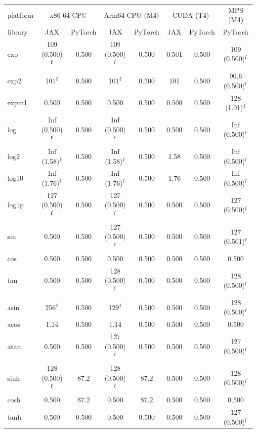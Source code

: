 \begin{table}
\centering
\begin{small}
\begin{tabular}{|l|cc|cc|cc|c|}
\hline
platform & \multicolumn{2}{c|}{x86-64 CPU} & \multicolumn{2}{c|}{Arm64 CPU (M4)} & \multicolumn{2}{c|}{CUDA (T4)} & \multicolumn{1}{c|}{MPS (M4)} \\
library & JAX & PyTorch & JAX & PyTorch & JAX & PyTorch & PyTorch \\ \hline
exp & 109 (0.500)$^{\rm f}$ & 0.500 & 109 (0.500)$^{\rm f}$ & 0.500 & 0.501 & 0.500 & 109 (0.500)$^{\rm f}$ \\
exp2 & 101$^{\rm f}$ & 0.500 & 101$^{\rm f}$ & 0.500 & 101 & 0.500 & 90.6 (0.500)$^{\rm f}$ \\
expm1 & 0.500 & 0.500 & 0.500 & 0.500 & 0.500 & 0.500 & 128 (1.01)$^{\rm f}$ \\
log & Inf (0.500)$^{\rm f}$ & 0.500 & Inf (0.500)$^{\rm f}$ & 0.500 & 0.500 & 0.500 & Inf (0.500)$^{\rm f}$ \\
log2 & Inf (1.58)$^{\rm f}$ & 0.500 & Inf (1.58)$^{\rm f}$ & 0.500 & 1.58 & 0.500 & Inf (0.500)$^{\rm f}$ \\
log10 & Inf (1.76)$^{\rm f}$ & 0.500 & Inf (1.76)$^{\rm f}$ & 0.500 & 1.76 & 0.500 & Inf (0.500)$^{\rm f}$ \\
log1p & 127 (0.500)$^{\rm f}$ & 0.500 & 127 (0.500)$^{\rm f}$ & 0.500 & 0.500 & 0.500 & 127 (0.500)$^{\rm f}$ \\
sin & 0.500 & 0.500 & 127 (0.500)$^{\rm f}$ & 0.500 & 0.500 & 0.500 & 127 (0.501)$^{\rm f}$ \\
cos & 0.500 & 0.500 & 0.500 & 0.500 & 0.500 & 0.500 & 0.500 \\
tan & 0.500 & 0.500 & 128 (0.500)$^{\rm f}$ & 0.500 & 0.500 & 0.500 & 128 (0.500)$^{\rm f}$ \\
asin & 256$^{\rm f}$ & 0.500 & 129$^{\rm f}$ & 0.500 & 0.500 & 0.500 & 128 (0.500)$^{\rm f}$ \\
acos & 1.14 & 0.500 & 1.14 & 0.500 & 0.500 & 0.500 & 0.500 \\
atan & 0.500 & 0.500 & 127 (0.500)$^{\rm f}$ & 0.500 & 0.500 & 0.500 & 127 (0.500)$^{\rm f}$ \\
sinh & 128 (0.500)$^{\rm f}$ & 87.2 & 128 (0.500)$^{\rm f}$ & 87.2 & 0.500 & 0.500 & 128 (0.500)$^{\rm f}$ \\
cosh & 0.500 & 87.2 & 0.500 & 87.2 & 0.500 & 0.500 & 0.500 \\
tanh & 0.500 & 0.500 & 0.500 & 0.500 & 0.500 & 0.500 & 127 (0.500)$^{\rm f}$ \\

\end{tabular}
\end{small}
\end{table}
